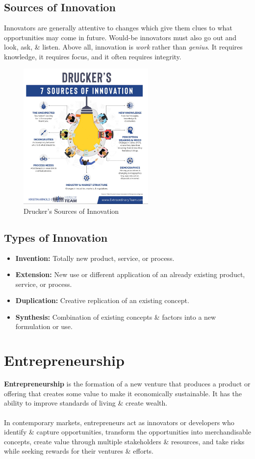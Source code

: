 \documentclass[a4paper,11pt]{article}
\begin{document}
\subsection{Sources of Innovation}
Innovators are generally attentive to changes which give them clues to what opportunities may come in future.
Would-be innovators must also go out and look, ask, \& listen.
Above all, innovation is \textit{work} rather than \textit{genius}.
It requires knowledge, it requires focus, and it often requires integrity.

\begin{figure}[H]
    \centering
    \includegraphics[width=0.6\textwidth]{images/druckers_sources_of_innovation.png}
    \caption{Drucker's Sources of Innovation}
\end{figure}

\subsection{Types of Innovation}
\begin{itemize}
    \item   \textbf{Invention:} Totally new product, service, or process.
    \item   \textbf{Extension:} New use or different application of an already existing product, service, or process.
    \item   \textbf{Duplication:} Creative replication of an existing concept.
    \item   \textbf{Synthesis:} Combination of existing concepts \& factors into a new formulation or use.
\end{itemize}

\section{Entrepreneurship}
\textbf{Entrepreneurship} is the formation of a new venture that produces a product or offering that creates some value to 
make it economically sustainable.
It has the ability to improve standards of living \& create wealth.
\\\\
In contemporary markets, entrepreneurs act as innovators or developers who identify \& capture opportunities, transform 
the opportunities into merchandisable concepts, create value through multiple stakeholders \& resources, and take risks 
while seeking rewards for their ventures \& efforts.
\end{document}
